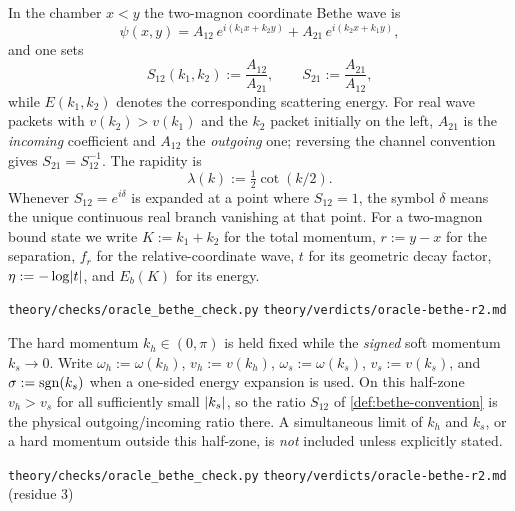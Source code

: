 \begin{definition}
\label{def:bethe-convention}
In the chamber $x<y$ the two-magnon coordinate Bethe wave is
\begin{equation}
  \psi(x,y)=A_{12}\,e^{i(k_1x+k_2y)}+A_{21}\,e^{i(k_2x+k_1y)},
\end{equation}
and one sets
\begin{equation}
  S_{12}(k_1,k_2):=\frac{A_{12}}{A_{21}},
  \qquad
  S_{21}:=\frac{A_{21}}{A_{12}},
\end{equation}
while $E(k_1,k_2)$ denotes the corresponding scattering energy. For real wave
packets with $v(k_2)>v(k_1)$ and the $k_2$ packet initially on the left,
$A_{21}$ is the \emph{incoming} coefficient and $A_{12}$ the \emph{outgoing}
one; reversing the channel convention gives $S_{21}=S_{12}^{-1}$. The rapidity
is
\begin{equation}
  \lambda(k):=\tfrac12\cot(k/2).
\end{equation}
Whenever $S_{12}=e^{i\delta}$ is expanded at a point where $S_{12}=1$, the
symbol $\delta$ means the unique continuous real branch vanishing at that
point. For a two-magnon bound state we write $K:=k_1+k_2$ for the total
momentum, $r:=y-x$ for the separation, $f_r$ for the relative-coordinate wave,
$t$ for its geometric decay factor, $\eta:=-\log\lvert t\rvert$, and $E_b(K)$ for its
energy.
\end{definition}
%
{\texttt{theory/checks/oracle\_bethe\_check.py}}%
{\texttt{theory/verdicts/oracle-bethe-r2.md}}

\begin{definition}
\label{def:bethe-soft-limit}
The hard momentum $k_h\in(0,\pi)$ is held fixed while the \emph{signed} soft
momentum $k_s\to0$. Write $\omega_h:=\omega(k_h)$, $v_h:=v(k_h)$,
$\omega_s:=\omega(k_s)$, $v_s:=v(k_s)$, and $\sigma:=\operatorname{sgn}(k_s)$ when a
one-sided energy expansion is used. On this half-zone $v_h>v_s$ for all
sufficiently small $\lvert k_s\rvert$, so the ratio $S_{12}$ of
\cref{def:bethe-convention} is the physical outgoing/incoming ratio there. A
simultaneous limit of $k_h$ and $k_s$, or a hard momentum outside this
half-zone, is \emph{not} included unless explicitly stated.
\end{definition}
%
{\texttt{theory/checks/oracle\_bethe\_check.py}}%
{\texttt{theory/verdicts/oracle-bethe-r2.md} (residue 3)}

